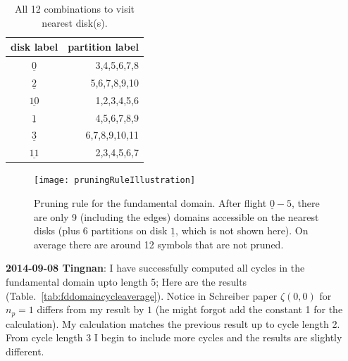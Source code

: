 \begin{table}
\begin{center}
\begin{tabular}{c|r}
disk label & partition label \\\hline
$\underline{0}$& 3,4,5,6,7,8\\
$\underline{2}$& 5,6,7,8,9,10\\
$\underline{10}$& 1,2,3,4,5,6\\
$\underline{1}$& 4,5,6,7,8,9\\
$\underline{3}$& 6,7,8,9,10,11\\
$\underline{11}$& 2,3,4,5,6,7\\
\hline
\end{tabular}
\end{center}
\caption{All 12 combinations to visit nearest disk(s). }
\label{tab:36symbols}
\end{table}
\begin{figure}
\texttt{[image: pruningRuleIllustration]}
\caption{Pruning rule for the fundamental domain. After flight $\underline{0}-5$, there are only 9 (including the edges) domains accessible on the nearest disks (plus 6 partitions on disk $\underline{1}$, which is not shown here). On average there are around 12 symbols that are not pruned.}
\label{fig:fdSymbolPruning}
\end{figure}

{\bf 2014-09-08 Tingnan}:
I have successfully computed all cycles in the fundamental domain upto length 5; Here are the results (Table.~\ref{tab:fddomaincycleaverage}). Notice in Schreiber paper $\zeta(0, 0)$ for $n_p = 1$ differs from my result by $1$ (he might forgot add the constant 1 for the calculation). My calculation matches the previous result up to cycle length 2. From cycle length 3 I begin to include more cycles and the results are slightly different.


